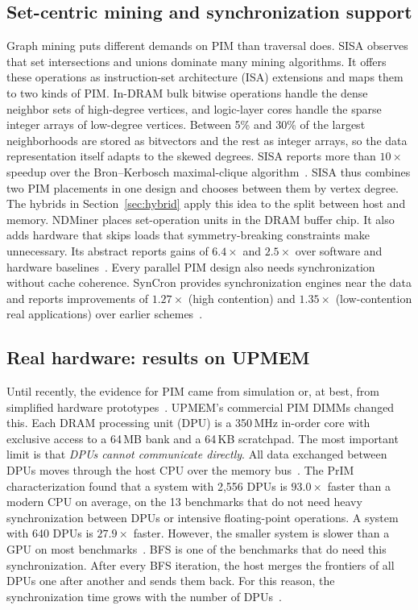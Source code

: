 \documentclass[journal,onecolumn]{IEEEtran}
\begin{document}
\subsection{Set-centric mining and synchronization support}
Graph mining puts different demands on PIM than traversal does. SISA observes that set intersections and unions dominate many mining algorithms. It offers these operations as instruction-set architecture (ISA) extensions and maps them to two kinds of PIM. In-DRAM bulk bitwise operations handle the dense neighbor sets of high-degree vertices, and logic-layer cores handle the sparse integer arrays of low-degree vertices. Between 5\% and 30\% of the largest neighborhoods are stored as bitvectors and the rest as integer arrays, so the data representation itself adapts to the skewed degrees. SISA reports more than $10\times$ speedup over the Bron--Kerbosch maximal-clique algorithm~\cite{besta2021sisa}. SISA thus combines two PIM placements in one design and chooses between them by vertex degree. The hybrids in Section~\ref{sec:hybrid} apply this idea to the split between host and memory. NDMiner places set-operation units in the DRAM buffer chip. It also adds hardware that skips loads that symmetry-breaking constraints make unnecessary. Its abstract reports gains of $6.4\times$ and $2.5\times$ over software and hardware baselines~\cite{talati2022ndminer}. Every parallel PIM design also needs synchronization without cache coherence. SynCron provides synchronization engines near the data and reports improvements of $1.27\times$ (high contention) and $1.35\times$ (low-contention real applications) over earlier schemes~\cite{giannoula2021syncron}.

\subsection{Real hardware: results on UPMEM}
Until recently, the evidence for PIM came from simulation or, at best, from simplified hardware prototypes~\cite{gomezluna2022prim}. UPMEM's commercial PIM DIMMs changed this. Each DRAM processing unit (DPU) is a 350\,MHz in-order core with exclusive access to a 64\,MB bank and a 64\,KB scratchpad. The most important limit is that \emph{DPUs cannot communicate directly}. All data exchanged between DPUs moves through the host CPU over the memory bus~\cite{gomezluna2022prim}. The PrIM characterization found that a system with 2,556 DPUs is $93.0\times$ faster than a modern CPU on average, on the 13 benchmarks that do not need heavy synchronization between DPUs or intensive floating-point operations. A system with 640 DPUs is $27.9\times$ faster. However, the smaller system is slower than a GPU on most benchmarks~\cite{gomezluna2022prim}. BFS is one of the benchmarks that do need this synchronization. After every BFS iteration, the host merges the frontiers of all DPUs one after another and sends them back. For this reason, the synchronization time grows with the number of DPUs~\cite{gomezluna2022prim}.
\end{document}
